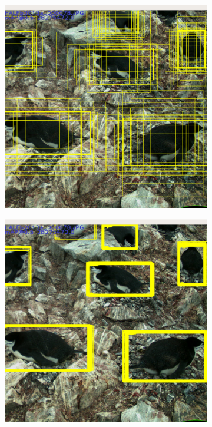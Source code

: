 \begin{figure}
  \centering
  \begin{subfigure}[t]{0.33\textwidth}
  \includegraphics[width=0.95\linewidth]{figures/object/anchors.png}
  \caption{}
  \end{subfigure}%
  \begin{subfigure}[t]{0.33\textwidth}
  \includegraphics[width=0.95\linewidth]{figures/object/predictions.png}

\end{subfigure}
\end{figure}
